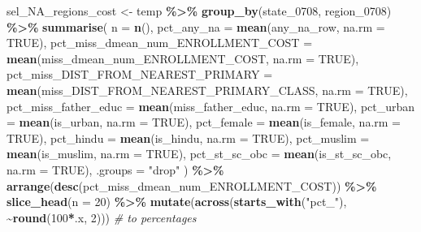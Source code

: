 \documentclass[
]{article}
\newenvironment{Shaded}{\begin{snugshade}}{\end{snugshade}}
\newcommand{\AttributeTok}[1]{\textcolor[rgb]{0.13,0.29,0.53}{#1}}
\newcommand{\CommentTok}[1]{\textcolor[rgb]{0.56,0.35,0.01}{\textit{#1}}}
\newcommand{\ConstantTok}[1]{\textcolor[rgb]{0.56,0.35,0.01}{#1}}
\newcommand{\DecValTok}[1]{\textcolor[rgb]{0.00,0.00,0.81}{#1}}
\newcommand{\FunctionTok}[1]{\textcolor[rgb]{0.13,0.29,0.53}{\textbf{#1}}}
\newcommand{\NormalTok}[1]{#1}
\newcommand{\OtherTok}[1]{\textcolor[rgb]{0.56,0.35,0.01}{#1}}
\newcommand{\SpecialCharTok}[1]{\textcolor[rgb]{0.81,0.36,0.00}{\textbf{#1}}}
\newcommand{\StringTok}[1]{\textcolor[rgb]{0.31,0.60,0.02}{#1}}
\begin{document}
\begin{Shaded}
\begin{Highlighting}[]
\NormalTok{sel\_NA\_regions\_cost }\OtherTok{\textless{}{-}}\NormalTok{ temp }\SpecialCharTok{\%\textgreater{}\%} 
  \FunctionTok{group\_by}\NormalTok{(state\_0708, region\_0708) }\SpecialCharTok{\%\textgreater{}\%}
  \FunctionTok{summarise}\NormalTok{(}
    \AttributeTok{n =} \FunctionTok{n}\NormalTok{(),}
    \AttributeTok{pct\_any\_na =} \FunctionTok{mean}\NormalTok{(any\_na\_row, }\AttributeTok{na.rm =} \ConstantTok{TRUE}\NormalTok{),}
    \AttributeTok{pct\_miss\_dmean\_num\_ENROLLMENT\_COST =} \FunctionTok{mean}\NormalTok{(miss\_dmean\_num\_ENROLLMENT\_COST, }\AttributeTok{na.rm =} \ConstantTok{TRUE}\NormalTok{),}
    \AttributeTok{pct\_miss\_DIST\_FROM\_NEAREST\_PRIMARY =} \FunctionTok{mean}\NormalTok{(miss\_DIST\_FROM\_NEAREST\_PRIMARY\_CLASS, }\AttributeTok{na.rm =} \ConstantTok{TRUE}\NormalTok{),}
    \AttributeTok{pct\_miss\_father\_educ =} \FunctionTok{mean}\NormalTok{(miss\_father\_educ, }\AttributeTok{na.rm =} \ConstantTok{TRUE}\NormalTok{),}
    \AttributeTok{pct\_urban =} \FunctionTok{mean}\NormalTok{(is\_urban, }\AttributeTok{na.rm =} \ConstantTok{TRUE}\NormalTok{),}
    \AttributeTok{pct\_female =} \FunctionTok{mean}\NormalTok{(is\_female, }\AttributeTok{na.rm =} \ConstantTok{TRUE}\NormalTok{),}
    \AttributeTok{pct\_hindu =} \FunctionTok{mean}\NormalTok{(is\_hindu, }\AttributeTok{na.rm =} \ConstantTok{TRUE}\NormalTok{),}
    \AttributeTok{pct\_muslim =} \FunctionTok{mean}\NormalTok{(is\_muslim, }\AttributeTok{na.rm =} \ConstantTok{TRUE}\NormalTok{),}
    \AttributeTok{pct\_st\_sc\_obc =} \FunctionTok{mean}\NormalTok{(is\_st\_sc\_obc, }\AttributeTok{na.rm =} \ConstantTok{TRUE}\NormalTok{),}
    \AttributeTok{.groups =} \StringTok{"drop"}
\NormalTok{  ) }\SpecialCharTok{\%\textgreater{}\%}
  \FunctionTok{arrange}\NormalTok{(}\FunctionTok{desc}\NormalTok{(pct\_miss\_dmean\_num\_ENROLLMENT\_COST)) }\SpecialCharTok{\%\textgreater{}\%}
  \FunctionTok{slice\_head}\NormalTok{(}\AttributeTok{n =} \DecValTok{20}\NormalTok{) }\SpecialCharTok{\%\textgreater{}\%}
  \FunctionTok{mutate}\NormalTok{(}\FunctionTok{across}\NormalTok{(}\FunctionTok{starts\_with}\NormalTok{(}\StringTok{"pct\_"}\NormalTok{), }\SpecialCharTok{\textasciitilde{}}\FunctionTok{round}\NormalTok{(}\DecValTok{100}\SpecialCharTok{*}\NormalTok{.x, }\DecValTok{2}\NormalTok{)))  }\CommentTok{\# to percentages}


\end{Highlighting}
\end{Shaded}
\end{document}
